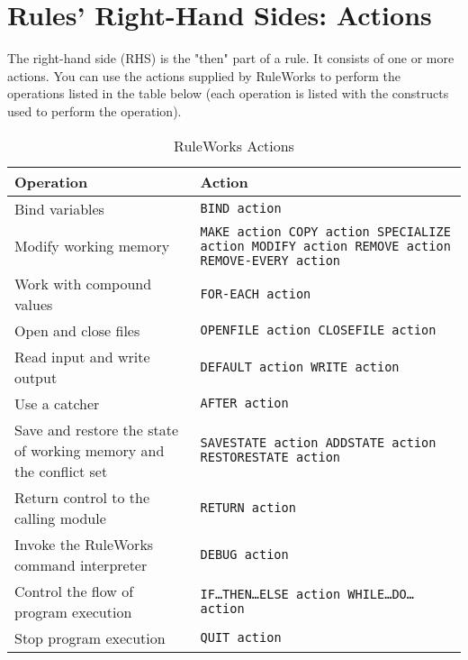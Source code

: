 \chapter{Rules' Right-Hand Sides: Actions}
\label{c:actions}

The right-hand side (RHS) is the "then" part of a rule. It consists of
one or more actions.  You can use the actions supplied by RuleWorks to
perform the operations listed in the table below (each operation is
listed with the constructs used to perform the operation).

\begin{table}[h]
  \begin{tabularx}{\columnwidth}{XX}
  \toprule
    Operation & Action \\
    \midrule
    Bind variables & \tt{BIND} action \\\addlinespace
    Modify working memory & \tt{MAKE} action\newline
                            \tt{COPY} action\newline
                            \tt{SPECIALIZE} action\newline
                            \tt{MODIFY} action\newline
                            \tt{REMOVE} action\newline
                            \tt{REMOVE-EVERY} action \\
    Work with compound values & \tt{FOR-EACH} action \\\addlinespace
    Open and close files & \tt{OPENFILE} action\newline
                           \tt{CLOSEFILE} action \\\addlinespace
    Read input and write output  
                           & \tt{DEFAULT} action \newline
                             \tt{WRITE} action \\\addlinespace
    Use a catcher & \tt{AFTER} action \\\addlinespace
    \raggedright
    Save and restore the state of working memory and the conflict set
                           & \tt{SAVESTATE} action\newline
                             \tt{ADDSTATE} action\newline
                             \tt{RESTORESTATE} action \\\addlinespace
    Return control to the  calling module
                           & \tt{RETURN} action \\\addlinespace
    \raggedright
    Invoke the RuleWorks command interpreter
                           & \tt{DEBUG} action \\\addlinespace
    Control the flow of  program execution
                           & \tt{IF}\ldots\tt{THEN}\ldots\tt{ELSE} action\newline
                             \tt{WHILE}\ldots\tt{DO}\ldots{} action \\\addlinespace
    Stop program execution & \tt{QUIT} action \\
    \bottomrule
  \end{tabularx}
  \caption{RuleWorks Actions}
\end{table}  

